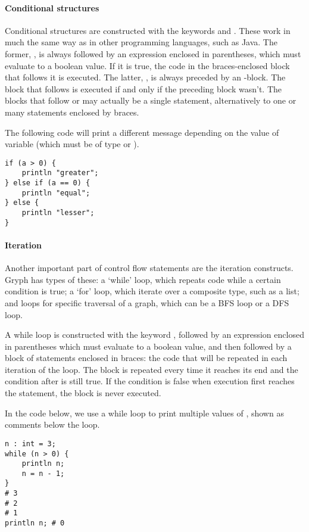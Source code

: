 \paragraph{Conditional structures}
\label{sec:conditional}
Conditional structures are constructed with the keywords  and . These work in much the same way as in other programming languages, such as Java. The former, , is always followed by an expression enclosed in parentheses, which must evaluate to a boolean value. If it is true, the code in the braces-enclosed block that follows it is executed. The latter, , is always preceded by an -block. The block that follows  is executed if and only if the preceding block wasn't. The blocks that follow  or  may actually be a single statement, alternatively to one or many statements enclosed by braces.

The following code will print a different message depending on the value of variable  (which must be of type  or ).
\begin{lstlisting}[language=Gryph]
if (a > 0) {
	println "greater";
} else if (a == 0) {
	println "equal";
} else {
	println "lesser";
}
\end{lstlisting}

\paragraph{Iteration}
\label{sec:iteration}
Another important part of control flow statements are the iteration constructs. Gryph has types of these: a `while' loop, which repeats code while a certain condition is true; a `for' loop, which iterate over a composite type, such as a list; and loops for specific traversal of a graph, which can be a BFS loop or a DFS loop.

A while loop is constructed with the keyword , followed by an expression enclosed in parentheses which must evaluate to a boolean value, and then followed by a block of statements enclosed in braces: the code that will be repeated in each iteration of the loop. The block is repeated every time it reaches its end and the condition after  is still true. If the condition is false when execution first reaches the  statement, the block is never executed.

In the code below, we use a while loop to print multiple values of , shown as comments below the loop.
\begin{lstlisting}[language=Gryph]
n : int = 3;
while (n > 0) {
	println n;
	n = n - 1;
}
# 3
# 2
# 1
println n; # 0
\end{lstlisting}

